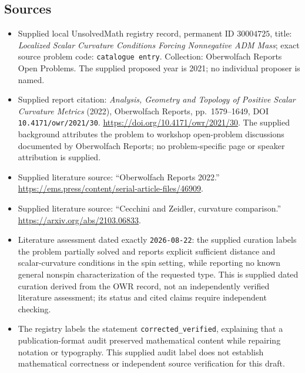 \documentclass[11pt]{article}
\begin{document}
\subsection{Sources}
\begin{itemize}
\item Supplied local UnsolvedMath registry record, permanent ID \(30004725\), title: \emph{Localized Scalar Curvature Conditions Forcing Nonnegative ADM Mass}; exact source problem code: \texttt{catalogue entry}. Collection: Oberwolfach Reports Open Problems. The supplied proposed year is 2021; no individual proposer is named.
\item Supplied report citation: \emph{Analysis, Geometry and Topology of Positive Scalar Curvature Metrics} (2022), Oberwolfach Reports, pp.\ 1579--1649, DOI \texttt{10.4171/owr/2021/30}. \url{https://doi.org/10.4171/owr/2021/30}. The supplied background attributes the problem to workshop open-problem discussions documented by Oberwolfach Reports; no problem-specific page or speaker attribution is supplied.
\item Supplied literature source: ``Oberwolfach Reports 2022.'' \url{https://ems.press/content/serial-article-files/46909}.
\item Supplied literature source: ``Cecchini and Zeidler, curvature comparison.'' \url{https://arxiv.org/abs/2103.06833}.
\item Literature assessment dated exactly \texttt{2026-08-22}: the supplied curation labels the problem partially solved and reports explicit sufficient distance and scalar-curvature conditions in the spin setting, while reporting no known general nonspin characterization of the requested type. This is supplied dated curation derived from the OWR record, not an independently verified literature assessment; its status and cited claims require independent checking.
\item The registry labels the statement \texttt{corrected\_verified}, explaining that a publication-format audit preserved mathematical content while repairing notation or typography. This supplied audit label does not establish mathematical correctness or independent source verification for this draft.
\end{itemize}
\end{document}
